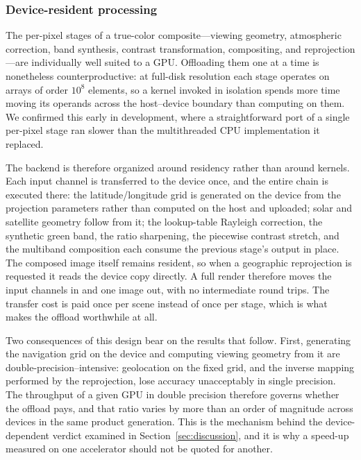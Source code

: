 \documentclass[11pt]{article}
\begin{document}
\subsubsection{Device-resident processing}
\label{sec:device}

The per-pixel stages of a true-color composite---viewing geometry, atmospheric
correction, band synthesis, contrast transformation, compositing, and
reprojection---are individually well suited to a GPU. Offloading them one at a
time is nonetheless counterproductive: at full-disk resolution each stage
operates on arrays of order $10^{8}$ elements, so a kernel invoked in isolation
spends more time moving its operands across the host--device boundary than
computing on them. We confirmed this early in development, where a
straightforward port of a single per-pixel stage ran slower than the
multithreaded CPU implementation it replaced.

The backend is therefore organized around residency rather than around kernels.
Each input channel is transferred to the device once, and the entire chain is
executed there: the latitude/longitude grid is generated on the device from the
projection parameters rather than computed on the host and uploaded; solar and
satellite geometry follow from it; the lookup-table Rayleigh correction, the
synthetic green band, the ratio sharpening, the piecewise contrast stretch, and
the multiband composition each consume the previous stage's output in place.
The composed image itself remains resident, so when a geographic reprojection
is requested it reads the device copy directly. A full render therefore moves
the input channels in and one image out, with no intermediate round trips. The
transfer cost is paid once per scene instead of once per stage, which is what
makes the offload worthwhile at all.

Two consequences of this design bear on the results that follow. First,
generating the navigation grid on the device and computing viewing geometry
from it are double-precision--intensive: geolocation on the fixed grid, and the
inverse mapping performed by the reprojection, lose accuracy unacceptably in
single precision. The throughput of a given GPU in double precision therefore
governs whether the offload pays, and that ratio varies by more than an order
of magnitude across devices in the same product generation. This is the
mechanism behind the device-dependent verdict examined in
Section~\ref{sec:discussion}, and it is why a speed-up measured on one
accelerator should not be quoted for another.
\end{document}
